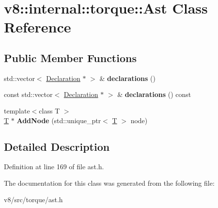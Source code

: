 \hypertarget{classv8_1_1internal_1_1torque_1_1Ast}{}\section{v8\+:\+:internal\+:\+:torque\+:\+:Ast Class Reference}
\label{classv8_1_1internal_1_1torque_1_1Ast}
\subsection*{Public Member Functions}
\begin{DoxyCompactItemize}
\item 
\mbox{\label{classv8_1_1internal_1_1torque_1_1Ast_a02455cee6259280154c228aa642f892c}} 
std\+::vector$<$ \mbox{\hyperlink{structv8_1_1internal_1_1torque_1_1Declaration}{Declaration}} $\ast$ $>$ \& {\bfseries declarations} ()
\item 
\mbox{\label{classv8_1_1internal_1_1torque_1_1Ast_a4e05bca3d30e47404051997ce2fd78cc}} 
const std\+::vector$<$ \mbox{\hyperlink{structv8_1_1internal_1_1torque_1_1Declaration}{Declaration}} $\ast$ $>$ \& {\bfseries declarations} () const
\item 
\mbox{\label{classv8_1_1internal_1_1torque_1_1Ast_aa0aeb19a01b9bf9e6e8d60c509efa095}} 
{\footnotesize template$<$class T $>$ }\\\mbox{\hyperlink{classv8_1_1internal_1_1torque_1_1T}{T}} $\ast$ {\bfseries Add\+Node} (std\+::unique\+\_\+ptr$<$ \mbox{\hyperlink{classv8_1_1internal_1_1torque_1_1T}{T}} $>$ node)
\end{DoxyCompactItemize}


\subsection{Detailed Description}


Definition at line 169 of file ast.\+h.



The documentation for this class was generated from the following file\+:\begin{DoxyCompactItemize}
\item 
v8/src/torque/ast.\+h\end{DoxyCompactItemize}
